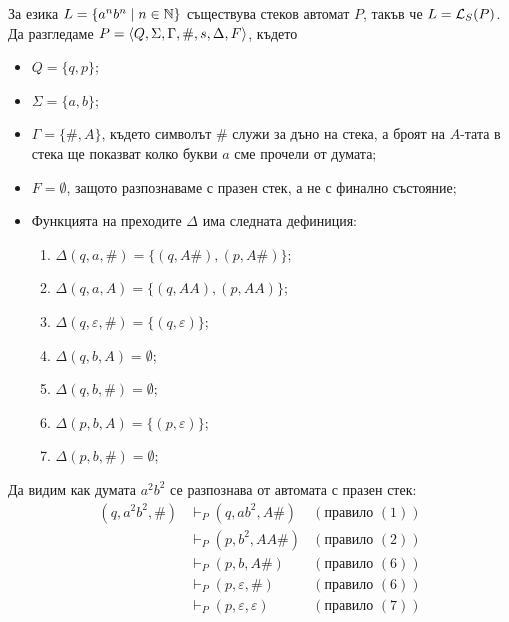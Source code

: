 \begin{example}
  \label{ex:anbn}
  За езика $L = \{a^nb^n\mid n\in\mathbb{N}\}$ съществува стеков автомат $P$, такъв че
  $L = \mathcal{L}_S(P)$.
  Да разгледаме $P = \langle{Q,\Sigma,\Gamma,\#,s,\Delta,F}\rangle$, където
  \begin{itemize}
  \item
    $Q = \{q,p\}$;
  \item
    $\Sigma = \{a,b\}$;
  \item
    $\Gamma = \{\#,A\}$, където символът $\#$ служи за дъно на стека, а броят на $A$-тата в стека ще показват колко букви $a$ сме прочели от думата;
  \item
    $F = \emptyset$, защото разпознаваме с празен стек, а не с финално състояние;
  \item
    Функцията на преходите $\Delta$ има следната дефиниция:
    \begin{enumerate}[(1)]
    \item
      $\Delta(q,a,\#) = \{(q, A\#), (p, A\#)\}$;
    \item
      $\Delta(q,a,A) = \{(q, AA), (p, AA)\}$;
    \item 
      $\Delta(q,\varepsilon,\#) = \{(q,\varepsilon)\}$;
    \item
      $\Delta(q, b, A) = \emptyset$;
    \item
      $\Delta(q, b, \#) = \emptyset$;
    \item 
      $\Delta(p, b, A) = \{(p,\varepsilon)\}$;
    \item 
      $\Delta(p, b, \#) = \emptyset$;
    \end{enumerate}
  \end{itemize}
  Да видим как думата $a^2b^2$ се разпознава от автомата с празен стек:
  \begin{align*}
    (q, a^2b^2, \#) & \vdash_P (q, ab^2, A\#) & (\text{правило }(1))\\
    & \vdash_P (p, b^2, AA\#) & (\text{правило }(2))\\
    & \vdash_P (p, b, A\#) & (\text{правило }(6))\\
    & \vdash_P (p, \varepsilon, \#) & (\text{правило }(6))\\
    & \vdash_P (p, \varepsilon, \varepsilon) & (\text{правило }(7))\\
  \end{align*}
\end{example}

